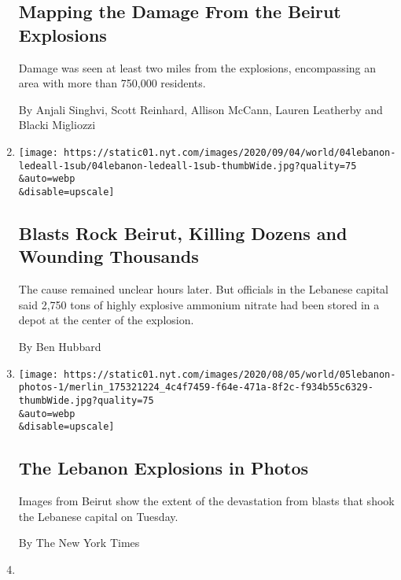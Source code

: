 \begin{enumerate}
  \hypertarget{mapping-the-damage-from-the-beirut-explosions}{%
  \subsection{Mapping the Damage From the Beirut
  Explosions}\label{mapping-the-damage-from-the-beirut-explosions}}

  Damage was seen at least two miles from the explosions, encompassing
  an area with more than 750,000 residents.

  By Anjali Singhvi, Scott Reinhard, Allison McCann, Lauren Leatherby
  and Blacki Migliozzi
\item
  \href{/2020/08/04/world/middleeast/lebanon-explosion.html}{}

  \texttt{[image: https://static01.nyt.com/images/2020/09/04/world/04lebanon-ledeall-1sub/04lebanon-ledeall-1sub-thumbWide.jpg?quality=75\\\&auto=webp\\\&disable=upscale]}

  \hypertarget{blasts-rock-beirut-killing-dozens-and-wounding-thousands}{%
  \subsection{Blasts Rock Beirut, Killing Dozens and Wounding
  Thousands}\label{blasts-rock-beirut-killing-dozens-and-wounding-thousands}}

  The cause remained unclear hours later. But officials in the Lebanese
  capital said 2,750 tons of highly explosive ammonium nitrate had been
  stored in a depot at the center of the explosion.

  By Ben Hubbard
\item
  \href{/2020/08/04/world/middleeast/beirut-lebanon-explosions-photos.html}{}

  \texttt{[image: https://static01.nyt.com/images/2020/08/05/world/05lebanon-photos-1/merlin\_175321224\_4c4f7459-f64e-471a-8f2c-f934b55c6329-thumbWide.jpg?quality=75\\\&auto=webp\\\&disable=upscale]}

  \hypertarget{the-lebanon-explosions-in-photos}{%
  \subsection{The Lebanon Explosions in
  Photos}\label{the-lebanon-explosions-in-photos}}

  Images from Beirut show the extent of the devastation from blasts that
  shook the Lebanese capital on Tuesday.

  By The New York Times
\item
  \href{/2020/08/04/world/middleeast/trump-assad-syria-sanctions.html}{}


\end{enumerate}
